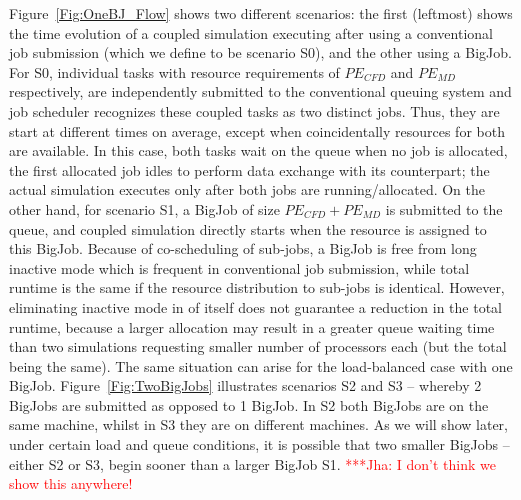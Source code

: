 \documentclass[conference,final]{IEEEtran}
\newcommand{\jhanote}[1]{ {\textcolor{red} { ***Jha: #1 }}}
\newcommand{\jhanote}[1]{}
\begin{document}
Figure~\ref{Fig:OneBJ_Flow} shows two different scenarios: the first
(leftmost) shows the time evolution of a coupled simulation executing
after using a conventional job submission (which we define to be
scenario S0), and the other using a BigJob. For S0, individual tasks
with resource requirements of $PE_{CFD}$ and $PE_{MD}$ respectively,
are independently submitted to the conventional queuing system and job
scheduler recognizes these coupled tasks as two distinct jobs. Thus,
they are start at different times on average, except when
coincidentally resources for both are available. In this case, both
tasks wait on the queue when no job is allocated, the first allocated
job idles to perform data exchange with its counterpart; the actual
simulation executes only after both jobs are running/allocated. On the
other hand, for scenario S1, a BigJob of size $PE_{CFD}+PE_{MD}$ is
submitted to the queue, and coupled simulation directly starts when
the resource is assigned to this BigJob. Because of co-scheduling of
sub-jobs, a BigJob is free from long inactive mode which is frequent
in conventional job submission, while total runtime is the same if the
resource distribution to sub-jobs is identical. However, eliminating
inactive mode in of itself does not guarantee a reduction in the total
runtime, because a larger allocation may result in a greater queue
waiting time than two simulations requesting smaller number of
processors each (but the total being the same). The same situation can
arise for the load-balanced case with one BigJob. %
Figure~\ref{Fig:TwoBigJobs} illustrates scenarios S2 and S3 -- whereby
2 BigJobs are submitted as opposed to 1 BigJob. In S2 both BigJobs are
on the same machine, whilst in S3 they are on different machines.  As
we will show later, under certain load and queue conditions, it is
possible that two smaller BigJobs -- either S2 or S3, begin sooner
than a larger BigJob S1. \jhanote{I don't think we show this
  anywhere!}
\end{document}
